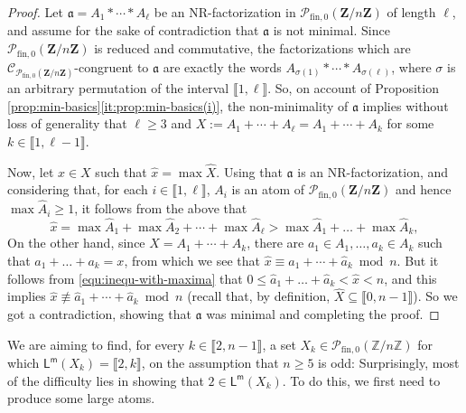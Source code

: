 \documentclass{report}
\renewcommand{\P}{\mathcal{P}}
\newcommand{\ZZ}{\mathbb{Z}}
\newcommand{\llb}{\llbracket}
\newcommand{\rrb}{\rrbracket}
\newcommand{\fin}{\textrm{fin}}
\newcommand{\m}{{\mathsf{m}}}
\renewcommand{\:}{\text{:}}
\theoremstyle{definition}
\begin{document}
\begin{proof}
	Let $\mathfrak{a} = A_1 \ast \cdots \ast A_\ell$ be an NR-factorization in $\mathcal P_{\fin,0}(\mathbf Z/n\mathbf Z)$ of length $\ell$, and assume for the sake of contradiction that $\mathfrak a$ is not minimal. Since
	$\P_{\fin,0}(\mathbf{Z}/n\mathbf{Z})$ is reduced and commutative, the factorizations which are $\mathscr C_{\P_{\fin,0}(\mathbf{Z}/n\mathbf{Z})}$-congruent to $\mathfrak{a}$ are exactly the words $A_{\sigma(1)} \ast \cdots \ast A_{\sigma(\ell)}$, where $\sigma$ is an arbitrary permutation of the interval $\llb 1, \ell \rrb$.
	So, on account of Proposition \ref{prop:min-basics}\ref{it:prop:min-basics(i)}, the non-minimality of $\mathfrak{a}$ implies without loss of generality that $\ell \ge 3$ and $
	X := A_1 + \cdots + A_\ell = A_1 + \cdots + A_k$ for some $k \in \llb 1, \ell-1 \rrb$. 
	
	Now, let $x \in X$ such that $\hat{x} = \max \hat{X}$. Using that $\mathfrak a$ is an NR-factorization, and considering that, for each $i \in \llb 1, \ell \rrb$, $A_i$ is an atom of $\mathcal P_{\fin,0}(\mathbf Z/n\mathbf Z)$ and hence $\max \hat{A}_i \ge 1$, it follows from the above that
	\begin{equation}\label{equ:inequ-with-maxima}
	\hat{x} = \max\hat{A}_1+\max\hat{A}_2+\cdots+\max\hat{A}_\ell > \max\hat{A}_1 + \dots + \max\hat{A}_k,
	\end{equation}
	On the other hand, since $X = A_1 + \cdots + A_k$, there are $a_1 \in A_1,\dots, a_k \in A_k$ such that $a_1+\dots+ a_k = x$, from which we see that $\hat{x} \equiv \hat{a}_1 + \cdots + \hat{a}_k \bmod n$. But it follows from \eqref{equ:inequ-with-maxima} that
	$
	0 \le \hat{a}_1+\dots+ \hat{a}_k < \hat{x} < n$, and this implies $\hat{x} \not\equiv \hat{a}_1 + \cdots + \hat{a}_k \bmod n$ (recall that, by definition, $\hat{X} \subseteq \llb 0, n-1 \rrb$). So we got a contradiction, showing that $\mathfrak a$ was minimal and completing the proof.
\end{proof}


We are aiming to find, for every $k\in\llb 2, n-1\rrb$, a set $X_k\in\P_{\fin,0}(\ZZ/n\ZZ)$ for which $\mathsf{L}^\m(X_k) = \llb 2, k \rrb$, on the assumption that $n\ge 5$ is odd:
Surprisingly, most of the difficulty lies in showing that $2\in \mathsf{L}^\m(X_k)$.
To do this, we first need to produce some large atoms.
\end{document}
